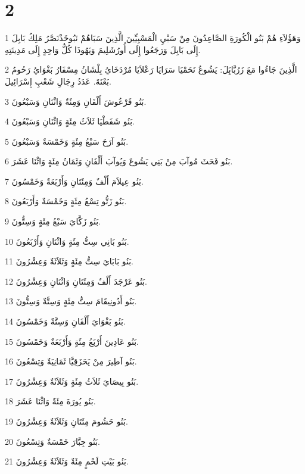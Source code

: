 \chapter{2}

\par 1 وَهَؤُلاَءِ هُمْ بَنُو الْكُورَةِ الصَّاعِدُونَ مِنْ سَبْيِ الْمَسْبِيِّينَ الَّذِينَ سَبَاهُمْ نَبُوخَذْنَصَّرُ مَلِكُ بَابِلَ إِلَى بَابِلَ وَرَجَعُوا إِلَى أُورُشَلِيمَ وَيَهُوذَا كُلُّ وَاحِدٍ إِلَى مَدِينَتِهِ.
\par 2 الَّذِينَ جَاءُوا مَعَ زَرُبَّابَِلَ: يَشُوعُ نَحَمْيَا سَرَايَا رَعْلاَيَا مُرْدَخَايُ بِلْشَانُ مِسْفَارُ بَغْوَايُ رَحُومُ بَعْنَةَ. عَدَدُ رِجَالِ شَعْبِ إِسْرَائِيلَ.
\par 3 بَنُو فَرْعُوشَ أَلْفَانِ وَمِئَةٌ وَاثْنَانِ وَسَبْعُونَ.
\par 4 بَنُو شَفَطْيَا ثَلاَثُ مِئَةٍ وَاثْنَانِ وَسَبْعُونَ.
\par 5 بَنُو آرَحَ سَبْعُ مِئَةٍ وَخَمْسَةٌ وَسَبْعُونَ.
\par 6 بَنُو فَحَثَ مُوآبَ مِنْ بَنِي يَشُوعَ وَيُوآبَ أَلْفَانِ وَثَمَانُ مِئَةٍ وَاثْنَا عَشَرَ.
\par 7 بَنُو عِيلاَمَ أَلْفٌ وَمِئَتَانِ وَأَرْبَعَةٌ وَخَمْسُونَ.
\par 8 بَنُو زَتُّو تِسْعُ مِئَةٍ وَخَمْسَةٌ وَأَرْبَعُونَ.
\par 9 بَنُو زَكَّايَ سَبْعُ مِئَةٍ وَسِتُّونَ.
\par 10 بَنُو بَانِي سِتُّ مِئَةٍ وَاثْنَانِ وَأَرْبَعُونَ.
\par 11 بَنُو بَابَايَ سِتُّ مِئَةٍ وَثَلاَثَةٌ وَعِشْرُونَ.
\par 12 بَنُو عَرْجَدَ أَلْفٌ وَمِئَتَانِ وَاثْنَانِ وَعِشْرُونَ.
\par 13 بَنُو أَدُونِيقَامَ سِتُّ مِئَةٍ وَسِتَّةٌ وَسِتُّونَ.
\par 14 بَنُو بَغْوَايَ أَلْفَانِ وَسِتَّةٌ وَخَمْسُونَ.
\par 15 بَنُو عَادِينَ أَرْبَعُ مِئَةٍ وَأَرْبَعَةٌ وَخَمْسُونَ.
\par 16 بَنُو آطِيرَ مِنْ يَحَزَقِيَّا ثَمَانِيَةٌ وَتِسْعُونَ.
\par 17 بَنُو بِيصَايَ ثَلاَثُ مِئَةٍ وَثَلاَثَةٌ وَعِشْرُونَ.
\par 18 بَنُو يُورَةَ مِئَةٌ وَاثْنَا عَشَرَ.
\par 19 بَنُو حَشُومَ مِئَتَانِ وَثَلاَثَةٌ وَعِشْرُونَ.
\par 20 بَنُو جِبَّارَ خَمْسَةٌ وَتِسْعُونَ.
\par 21 بَنُو بَيْتِ لَحْمٍ مِئَةٌ وَثَلاَثَةٌ وَعِشْرُونَ.
